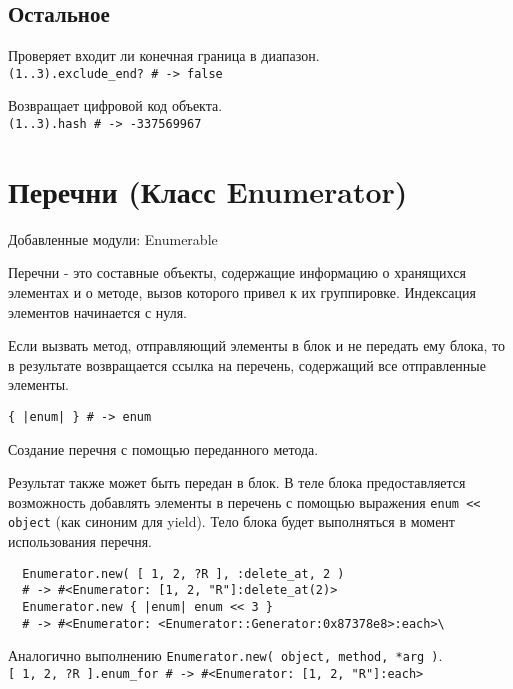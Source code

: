 \subsection*{Остальное}

\begin{methodlist}
  Проверяет входит ли конечная граница в диапазон. 
  \\\verb!(1..3).exclude_end? # -> false!

  Возвращает цифровой код объекта. 
  \\\verb!(1..3).hash # -> -337569967!
\end{methodlist}

\section{Перечни (Класс Enumerator)}

Добавленные модули: Enumerable 

Перечни - это составные объекты, содержащие информацию о хранящихся элементах и о методе, вызов которого привел к их группировке. Индексация элементов начинается с нуля. 

Если вызвать метод, отправляющий элементы в блок и не передать ему блока, то в результате возвращается ссылка на перечень, содержащий все отправленные элементы. 

\begin{methodlist}
  \verb!{ |enum| } # -> enum!

  Создание перечня с помощью переданного метода. 

  Результат также может быть передан в блок. В теле блока предоставляется возможность добавлять элементы в перечень с помощью выражения \verb!enum << object! (как синоним для yield). Тело блока будет выполняться в момент использования перечня.
  \begin{verbatim}
  Enumerator.new( [ 1, 2, ?R ], :delete_at, 2 ) 
  # -> #<Enumerator: [1, 2, "R"]:delete_at(2)> 
  Enumerator.new { |enum| enum << 3 } 
  # -> #<Enumerator: <Enumerator::Generator:0x87378e8>:each>\
  \end{verbatim}

  \alias{to_enum}
  Аналогично выполнению \verb!Enumerator.new( object, method, *arg )!. 
  \\\verb![ 1, 2, ?R ].enum_for # -> #<Enumerator: [1, 2, "R"]:each>!
\end{methodlist}

